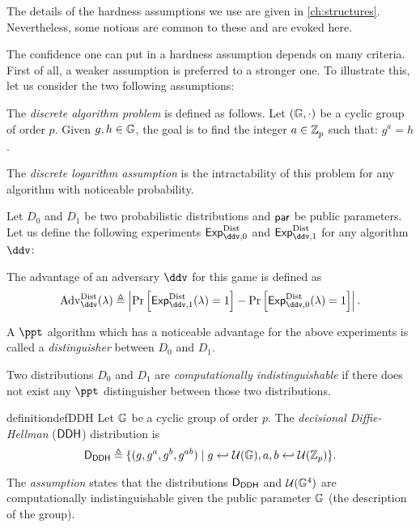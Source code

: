 The details of the hardness assumptions we use are given in \cref{ch:structures}.
Nevertheless, some notions are common to these and are evoked here.

The confidence one can put in a hardness assumption depends on many criteria.  
First of all, a weaker assumption is preferred to a stronger one.
To illustrate this, let us consider the two following assumptions:

\begin{definition} \label{de:DLP}
  The \emph{discrete algorithm problem} is defined as follows. Let $(\mathbb{G}, \cdot)$ be a cyclic group of order $p$.
  Given $g,h \in \mathbb{G}$, the goal is to find the integer $a \in \mathbb{Z}_p^{}$ such that: $g^a_{} = h$.

  The \textit{discrete logarithm assumption} is the intractability of this problem for any \ppt{} algorithm with noticeable probability.
\end{definition}

\begin{definition}[Indistinguishability] \label{de:indistinguishability}
  Let $D_0$ and $D_1$ be two probabilistic distributions and $\mathsf{par}$ be public parameters. Let us define the following experiments $\Exp{\mathrm{Dist}}{\ddv, 0}$ and $\Exp{\mathrm{Dist}}{\ddv, 1}$ for any algorithm $\ddv$:
  \begin{center}
  \end{center}
  The advantage of an adversary $\ddv$ for this game is defined as
  \[ \advantage{\mathrm{Dist}}{\ddv}(\lambda) \triangleq \left| \Pr\left[ \Exp{\mathrm{Dist}}{\ddv, 1}(\lambda) = 1\right] - \Pr\left[ \Exp{\mathrm{Dist}}{\ddv, 0}(\lambda) = 1 \right] \right|. \]

  A $\ppt$ algorithm which has a noticeable advantage for the above experiments is called a \textit{distinguisher} between $D_0$ and $D_1$.

  Two distributions $D_0$ and $D_1$ are \textit{computationally indistinguishable} if there does not exist any $\ppt$ distinguisher between those two distributions.
\end{definition}

\begin{restatable}{definition}{defDDH}
   \label{de:DDH}
  Let $\mathbb{G}$ be a cyclic group of order $p$. The \emph{decisional Diffie-Hellman} ($\textsf{DDH}$) distribution is
  \[\mathsf{D}_{\textsf{DDH}} \triangleq \{ (g, g^a, g^b, g^{ab}) \mid g \hookleftarrow \mathcal U(\mathbb{G}), a,b \hookleftarrow \mathcal U(\mathbb{Z}_p) \}.\]

  The \textit{\DDH assumption} states that the distributions $\mathsf{D}_{\textsf{DDH}}$ and $\mathcal U(\mathbb{G}^4)$ are computationally indistinguishable given the public parameter $\mathbb{G}$ (the description of the group).
\end{restatable}

